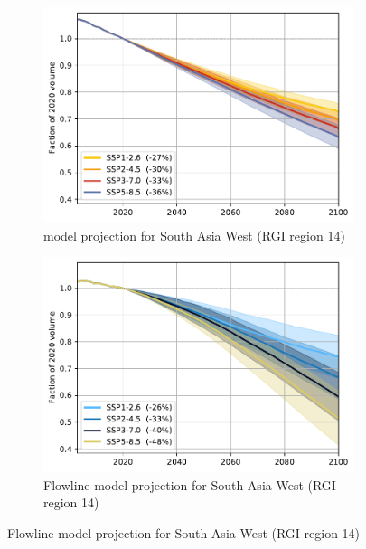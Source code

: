 \begin{figure}[htp]
          \begin{subfigure}[b]{0.476\textwidth}
              \caption{\Vas{} model projection for South Asia West (RGI region 14) }
              \label{fig:cmip:vas_reg_14}
              \centering
              \includegraphics[width=\textwidth]{../plots/final_plots/time_series/cmip/cmip_vas_14.pdf}
          \end{subfigure}
          \hfill
          \begin{subfigure}[b]{0.476\textwidth}
              \caption{Flowline model projection for South Asia West (RGI region 14) }
              \label{fig:cmip:fl_reg_14}
              \centering
              \includegraphics[width=\textwidth]{../plots/final_plots/time_series/cmip/cmip_fl_14.pdf}
          \end{subfigure}


\end{figure}
